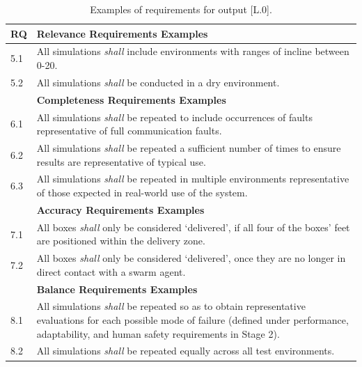 \documentclass[runningheads]{llncs}
\begin{document}
\begin{table}[!h]%
	\centering
	\begin{tabular}{p{0.6cm} p{11.6cm}}
		\textbf{RQ} & \textbf{Relevance Requirements Examples} \\
		\hline
		5.1 & All simulations \emph{shall} include environments with ranges of incline between 0-20\textdegree.\\
		\hline
		5.2 & All simulations \emph{shall} be conducted in a dry environment.\\
		\hline
		& \textbf{Completeness Requirements Examples} \\
		\hline
		6.1 & All simulations \emph{shall} be repeated to include occurrences of faults representative of full communication faults.\\
		\hline
		6.2 & All simulations \emph{shall} be repeated a sufficient number of times to ensure results are representative of typical use.\\
		\hline
		6.3 & All simulations \emph{shall} be repeated in multiple environments representative of those expected in real-world use of the system.\\
		\hline
		& \textbf{Accuracy Requirements Examples} \\
		\hline
		7.1 & All boxes \emph{shall} only be considered `delivered’, if all four of the boxes’ feet are positioned within the delivery zone.\\
		\hline
		7.2 & All boxes \emph{shall} only be considered `delivered’, once they are no longer in direct contact with a swarm agent.\\
		\hline
		& \textbf{Balance Requirements Examples} \\
		\hline
		8.1 & All simulations \emph{shall} be repeated so as to obtain representative evaluations for each possible mode of failure (defined under performance, adaptability, and human safety requirements in Stage 2).\\
		\hline
		8.2 & All simulations \emph{shall} be repeated equally across all test environments.\\
		\hline
	\end{tabular}
	\caption{Examples of requirements for output [L.0].}
	\label{tab:L0_req}
	\vspace{-4ex}
\end{table}
\end{document}
